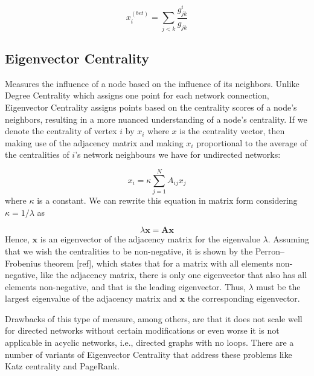 \begin{equation}
    x_i^{(bet)}= \sum_{j<k}^{}\frac{g_{jk}^i}{g_{jk}}
\end{equation}

\subsection*{Eigenvector Centrality} Measures the influence of a node based on the influence of its neighbors. Unlike Degree Centrality which assigns one point for each network connection, Eigenvector Centrality assigns points based on the centrality scores of a node's neighbors, resulting in a more nuanced understanding of a node's centrality. If we denote the centrality of vertex $i$ by $x_i$ where $x$ is the centrality vector, then making use of the adjacency matrix and making $x_i$ proportional to the average of the centralities of $i$’s network neighbours we have for undirected networks:

\begin{equation}
\label{eqn:eigc}
    x_i= \kappa\sum_{j=1}^{N}A_{ij}x_j
\end{equation}
where $\kappa$ is a constant. We can rewrite this equation in matrix form considering $\kappa=1/\lambda$ as

\begin{equation}
    \lambda \mathbf{x} = \mathbf{A}\mathbf{x}
\end{equation}
Hence, $\mathbf{x}$ is an eigenvector of the adjacency matrix for the eigenvalue $\lambda$. Assuming that we wish the centralities to be non-negative, it is shown by the Perron–Frobenius theorem [ref], which states that for a matrix with all elements non-negative, like the adjacency matrix, there is only one eigenvector that also has all elements non-negative, and that is the leading eigenvector. Thus, $\lambda$ must be the largest eigenvalue of the adjacency matrix and $\mathbf{x}$ the corresponding eigenvector. 

Drawbacks of this type of measure, among others, are that it does not scale well for directed networks without certain modifications or even worse it is not applicable in acyclic networks, i.e., directed graphs with no loops. There are a number of variants of Eigenvector Centrality that address these
problems like Katz centrality and PageRank.

